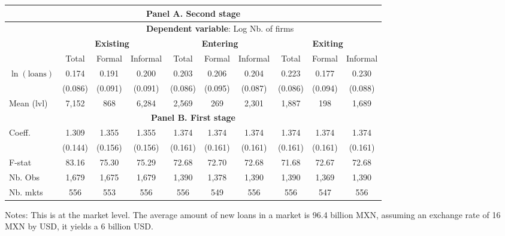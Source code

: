 \centering
\begin{threeparttable}
\begin{tabular}{lccccccccc}
\toprule
\multicolumn{10}{c}{\textbf{Panel A. Second stage}} \\
\midrule
& \multicolumn{9}{c}{\textbf{Dependent variable}: Log Nb. of firms} \\
\cmidrule(lr){2-10}
 & \multicolumn{3}{c}{\textbf{Existing}} & \multicolumn{3}{c}{\textbf{Entering}} & \multicolumn{3}{c}{\textbf{Exiting}} \\
\cmidrule(lr){2-10}
& Total 
& Formal 
& \multicolumn{1}{c}{Informal}
& Total 
& Formal 
& \multicolumn{1}{c}{Informal}
& Total 
& Formal 
& Informal \\
\midrule
$\ln(\text{loans})$
&  0.174  & 0.191  & 0.200   &  0.203  & 0.206   & 0.204  & 0.223   & 0.177   & 0.230 \\
& (0.086) & (0.091) & (0.091) & (0.086) & (0.095) & (0.087) & (0.086) & (0.094) & (0.088) \\
\midrule
Mean (lvl) & 7,152 & 868 & 6,284 & 2,569 & 269 & 2,301 & 1,887 & 198 & 1,689\\
\midrule
\multicolumn{10}{c}{\textbf{Panel B. First stage}} \\
\midrule
 Coeff.  & 1.309   & 1.355   & 1.355   & 1.374 & 1.374 & 1.374 & 1.374 & 1.374 & 1.374 \\
         & (0.144) & (0.156) & (0.156) & (0.161) & (0.161) & (0.161) & (0.161) & (0.161) & (0.161) \\
F-stat   & 83.16  & 75.30  & 75.29 & 72.68 & 72.70 & 72.68 & 71.68 & 72.67 & 72.68 \\
Nb. Obs  & 1,679   & 1,675   & 1,679 & 1,390 & 1,378 & 1,390 & 1,390 & 1,369 & 1,390 \\
Nb. mkts & 556     & 553     & 556 & 556 & 549 & 556 & 556 & 547 & 556 \\

\bottomrule
\end{tabular}
\begin{tablenotes}[flushleft]
\tiny
\item Notes: This is at the market level. The average amount of new loans in a market is 96.4 billion MXN, assuming an exchange rate of 16 MXN by USD, it yields a 6 billion USD.
\end{tablenotes}
\end{threeparttable}